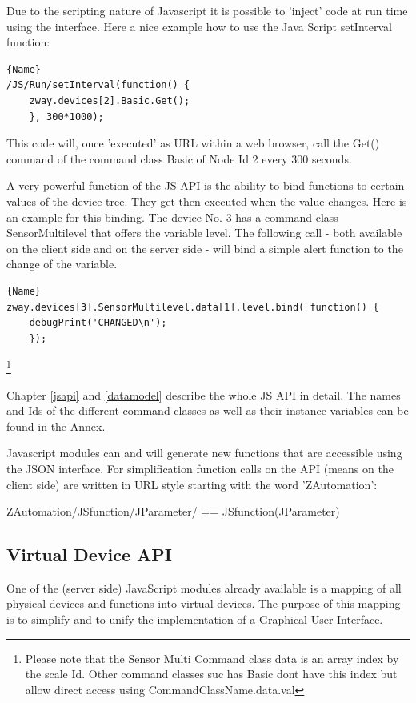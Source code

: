 Due to the scripting nature of Javascript it is possible to 'inject' code at run time
using the interface. Here a nice example how to use the Java Script 
setInterval function:

\begin{lstlisting}[caption=Set Interval]{Name}
/JS/Run/setInterval(function() { 
	zway.devices[2].Basic.Get();
	}, 300*1000);
\end{lstlisting}

This code will, once 'executed' as URL within a web browser, call the Get() command
of the command class Basic of Node Id 2 every 300 seconds.  

A very powerful function of the JS API is the ability to bind functions to certain
values of the device tree. They get then executed when the value changes. Here is an 
example for this binding. The device No. 3 has a command class SensorMultilevel that offers
the variable level. The following call - both available on the client side 
and on the server side - will bind a simple alert function to the change of 
the variable.

\begin{lstlisting}[caption=Bind a function]{Name}
zway.devices[3].SensorMultilevel.data[1].level.bind( function() { 
	debugPrint('CHANGED\n'); 
	});  
\end{lstlisting}\footnote{Please note that the Sensor Multi Command class data is an array
index by the scale Id. Other command classes suc has Basic dont have this index but allow direct access using 
CommandClassName.data.val}

Chapter \ref{jsapi} and \ref{datamodel} describe the whole JS API in detail. The names 
and Ids of the different command classes as well as their instance variables can be found
in the Annex.

Javascript modules can and will generate new functions that are accessible using the 
JSON interface. For simplification function calls on the API (means on the client
side) are written in URL style starting with the word 'ZAutomation':

\begin{center}
ZAutomation/JSfunction/JParameter/
== JSfunction(JParameter)
\end{center}

\subsection{Virtual Device API}

One of the (server side) JavaScript modules already available is a mapping of all 
physical devices and functions into virtual devices. The purpose of this mapping is 
to simplify and to unify the implementation of a Graphical User Interface.

